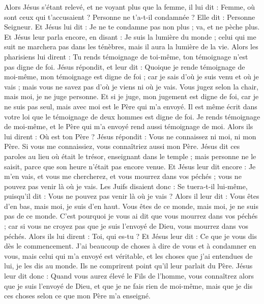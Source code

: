 \begin{multicols}{2}
Alors Jésus s'étant relevé, et ne voyant plus que la femme, il lui dit : Femme, où sont ceux qui t'accusaient ? Personne ne t'a-t-il condamnée ?
Elle dit : Personne Seigneur. Et Jésus lui dit : Je ne te condamne pas non plus ; va, et ne pèche plus.
Et Jésus leur parla encore, en disant : Je suis la lumière du monde ; celui qui me suit ne marchera pas dans les ténèbres, mais il aura la lumière de la vie.
Alors les pharisiens lui dirent : Tu rends témoignage de toi-même, ton témoignage n'est pas digne de foi.
Jésus répondit, et leur dit : Quoique je rende témoignage de moi-même, mon témoignage est digne de foi ; car je sais d'où je suis venu et où je vais ; mais vous ne savez pas d'où je viens ni où je vais.
Vous jugez selon la chair, mais moi, je ne juge personne.
Et si je juge, mon jugement est digne de foi, car je ne suis pas seul, mais avec moi est le Père qui m'a envoyé.
Il est même écrit dans votre loi que le témoignage de deux hommes est digne de foi.
Je rends témoignage de moi-même, et le Père qui m'a envoyé rend aussi témoignage de moi.
Alors ils lui dirent : Où est ton Père ? Jésus répondit : Vous ne connaissez ni moi, ni mon Père. Si vous me connaissiez, vous connaîtriez aussi mon Père.
Jésus dit ces paroles au lieu où était le trésor, enseignant dans le temple ; mais personne ne le saisit, parce que son heure n'était pas encore venue.
Et Jésus leur dit encore : Je m'en vais, et vous me chercherez, et vous mourrez dans vos péchés ; vous ne pouvez pas venir là où je vais.
Les Juifs disaient donc : Se tuera-t-il lui-même, puisqu'il dit : Vous ne pouvez pas venir là où je vais ?
Alors il leur dit : Vous êtes d'en bas, mais moi, je suis d'en haut. Vous êtes de ce monde, mais moi, je ne suis pas de ce monde.
C'est pourquoi je vous ai dit que vous mourrez dans vos péchés ; car si vous ne croyez pas que je suis l'envoyé de Dieu, vous mourrez dans vos péchés.
Alors ils lui dirent : Toi, qui es-tu ? Et Jésus leur dit : Ce que je vous dis dès le commencement.
J'ai beaucoup de choses à dire de vous et à condamner en vous, mais celui qui m'a envoyé est véritable, et les choses que j'ai entendues de lui, je les dis au monde.
Ils ne comprirent point qu'il leur parlait du Père.
Jésus leur dit donc : Quand vous aurez élevé le Fils de l'homme, vous connaîtrez alors que je suis l'envoyé de Dieu, et que je ne fais rien de moi-même, mais que je dis ces choses selon ce que mon Père m'a enseigné.

\end{multicols}
